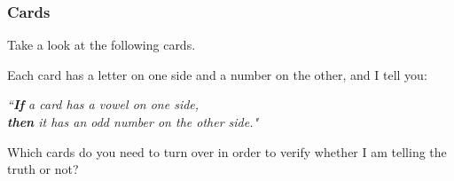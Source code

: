 \begin{frame}
	\frametitle{Cards}

	Take a look at the following cards.

	\begin{center}
	\end{center}

	Each card has a letter on one side and a number on the other, and I tell you:

	\medskip
	\begin{block}{}
		\emph{``\textbf{If} a card has a vowel on one side, \\ \textbf{then} it has an
		odd number on the other side." }
	\end{block}

	\medskip
	Which cards do you need to turn over in order to verify whether I am telling the
	truth or not?
















\end{frame}

